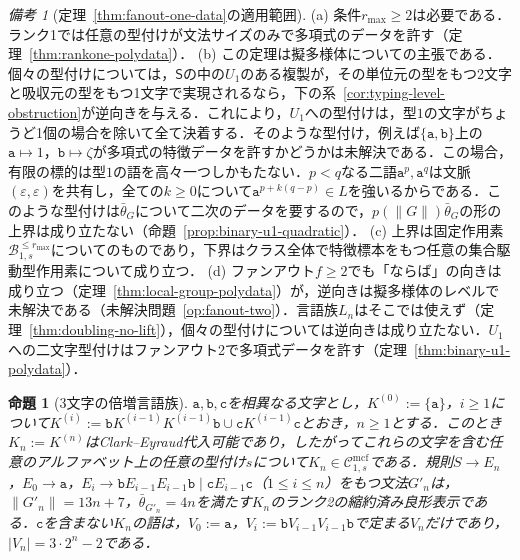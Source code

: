 \documentclass[11pt,a4paper]{ltjsarticle}
\numberwithin{equation}{section}
\theoremstyle{plain}
\newtheorem{proposition}[theorem]{命題}
\theoremstyle{definition}
\theoremstyle{remark}
\newtheorem{remark}[theorem]{備考}
\newcommand{\Cmcf}[2]{\mathcal{C}^{\mathrm{mcf}}_{#1,#2}}
\newcommand{\eps}{\varepsilon}
\begin{document}
\begin{remark}[定理~\ref{thm:fanout-one-data}の適用範囲]
\label{rem:fanout-one-data}
(a) 条件$r_{\max}\ge2$は必要である．ランク1では任意の型付けが文法サイズのみで多項式のデータを許す（定理~\ref{thm:rankone-polydata}）．
(b) この定理は擬多様体についての主張である．個々の型付けについては，$\mathsf S$の中の$U_1$のある複製が，その単位元の型をもつ2文字と吸収元の型をもつ1文字で実現されるなら，下の系~\ref{cor:typing-level-obstruction}が逆向きを与える．これにより，$U_1$への型付けは，型$1$の文字がちょうど1個の場合を除いて全て決着する．そのような型付け，例えば$\{\mathtt a,\mathtt b\}$上の$\mathtt a\mapsto1$，$\mathtt b\mapsto\zeta$が多項式の特徴データを許すかどうかは未解決である．この場合，有限の標的は型$1$の語を高々一つしかもたない．$p<q$なる二語$\mathtt a^p,\mathtt a^q$は文脈$(\eps,\eps)$を共有し，全ての$k\ge0$について$\mathtt a^{p+k(q-p)}\in L$を強いるからである．このような型付けは$\bar\theta_G$について二次のデータを要するので，$p(\|G\|)\bar\theta_G$の形の上界は成り立たない（命題~\ref{prop:binary-u1-quadratic}）．
(c) 上界は固定作用素$\mathcal B^{\le r_{\max}}_{1,s}$についてのものであり，下界はクラス全体で特徴標本をもつ任意の集合駆動型作用素について成り立つ．
(d) ファンアウト$f\ge2$でも「ならば」の向きは成り立つ（定理~\ref{thm:local-group-polydata}）が，逆向きは擬多様体のレベルで未解決である（未解決問題~\ref{op:fanout-two}）．言語族$L_n$はそこでは使えず（定理~\ref{thm:doubling-no-lift}），個々の型付けについては逆向きは成り立たない．$U_1$への二文字型付けはファンアウト2で多項式データを許す（定理~\ref{thm:binary-u1-polydata}）．
\end{remark}

\begin{proposition}[3文字の倍増言語族]
\label{prop:three-letter-family}
$\mathtt a,\mathtt b,\mathtt c$を相異なる文字とし，$K^{(0)}:=\{\mathtt a\}$，$i\ge1$について$K^{(i)}:=\mathtt bK^{(i-1)}K^{(i-1)}\mathtt b\cup\mathtt cK^{(i-1)}\mathtt c$とおき，$n\ge1$とする．このとき$K_n:=K^{(n)}$はClark--Eyraud代入可能であり，したがってこれらの文字を含む任意のアルファベット上の任意の型付け$s$について$K_n\in\Cmcf{1}{s}$である．規則$S\to E_n$，$E_0\to\mathtt a$，$E_i\to\mathtt bE_{i-1}E_{i-1}\mathtt b\mid\mathtt cE_{i-1}\mathtt c$（$1\le i\le n$）をもつ文法$G'_n$は，$\|G'_n\|=13n+7$，$\bar\theta_{G'_n}=4n$を満たす$K_n$のランク2の縮約済み良形表示である．$\mathtt c$を含まない$K_n$の語は，$V_0:=\mathtt a$，$V_i:=\mathtt bV_{i-1}V_{i-1}\mathtt b$で定まる$V_n$だけであり，$|V_n|=3\cdot2^n-2$である．
\end{proposition}
\end{document}
